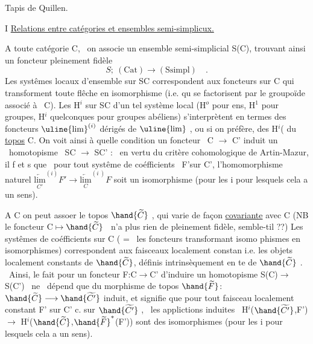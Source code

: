  

Tapis de Quillen.

I \quad \uline{Relations entre catégories et ensembles semi-simplicux.}

A toute catégorie C, \ on associe un ensemble semi-simplicial S(C),
trouvant ainsi un foncteur pleinement fidèle 
\[ S;\ (\mathrm{Cat}) \longrightarrow (\mathrm{Ssimpl}) \quad . \]
 Les systêmes locaux d'ensemble sur SC correspondent
aux foncteurs sur C qui transforment toute flêche en isomorphisme (i.e.
qu se factorisent par le groupoïde associé à \ C). Les H$^{i}$ sur SC d'un tel
système local (H$^{o}$ pour ens, H$^{1}$ pour groupes, H$^{i}$ quelconques pour groupes
abéliens) s'interprètent en termes des foncteurs $\uline{\mathrm{lim}}^{(i)}$ dérigés de $\uline{\mathrm{lim}}$ ,
ou si on préfère, des H$^{i}$( du \uline{topos} C\hand{\unsure{$\widetilde{\ }$}}. On voit ainsi à quelle condition
un foncteur \ C $\longrightarrow$ C' induit un \ homotopisme \ SC $\longrightarrow$ SC' : \ en vertu du
critère cohomologique de Artin-Mazur, il f et s que \ pour tout systême
de coéfficients \ F'sur C', l'homomorphisme naturel $\underset{C'}{\underleftarrow{\mathrm{lim}}}^{(i)}F' \longrightarrow \underset{C}{\underleftarrow{\mathrm{lim}}}^{(i\ )}F$
soit un isomorphisme (pour les i pour lesquels cela a un sens). 

A C on peut assoer le topos $\hand{\widetilde{C}}$ , qui varie de façon \uline{covariante} avec C
(NB le foncteur C$\longmapsto$$\hand{\widetilde{C}}$ \ n'a plus rien de pleinement fidèle, semble-t\unsure{-}il ??)
Les systêmes de coéfficients  sur C (  = \ les foncteurs  transformant isomo%
phismes en isomorphismes) correspondent aux faisceaux localement constan
i.e. les objets localement constants de $\hand{\widetilde{C}}$, définis intrinsèquement en te
de $\hand{\widetilde{C}}$ . \ Ainsi, le fait pour un foncteur F:C$\longrightarrow$C' d'induire un
homotopisme S(C)$\longrightarrow$S(C') \ ne \ dépend que du morphisme de topos $\hand{\widetilde{F}}$: $\hand{\widetilde{C}} \longrightarrow \hand{\widetilde{C'}}$
induit, et signifie que pour tout faisceau localement constant F' sur C'
c. sur $\hand{\widetilde{C'}}$ , \ les applictions induites \ H$^{i}$($\hand{\widetilde{C'}}$,F') $\longrightarrow$ H$^{i}$($\hand{\widetilde{C}}$,$\hand{\widetilde{F}}^{*}$(F'))
sont des isomorphismes (pour les i pour lesquels cela a un sens).

